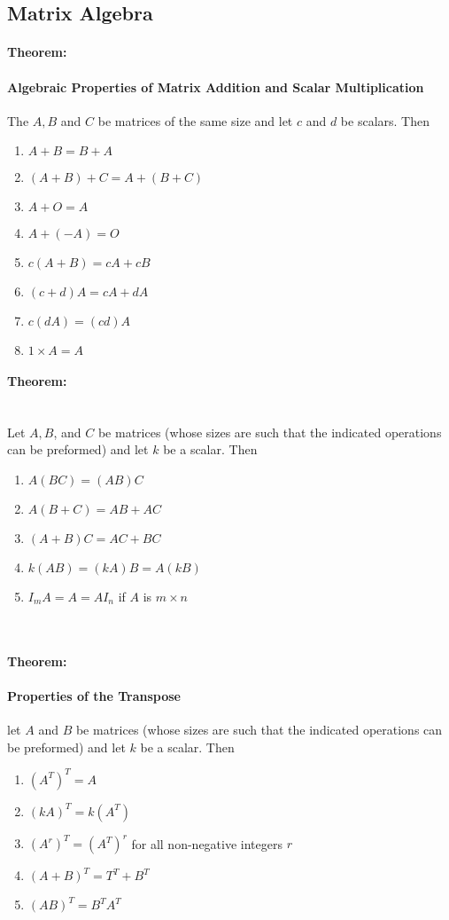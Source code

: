 \documentclass[12pt]{article}
\newenvironment{theorem}{\paragraph{Theorem:\hfill}}{\hfill}
\begin{document}
\subsection{Matrix Algebra}

\begin{theorem}
	\paragraph{Algebraic Properties of Matrix Addition and Scalar Multiplication}
	The $A, B$ and $C$ be matrices of the same size and let $c$ and $d$ be scalars. Then
	\begin{enumerate}
		\item $A + B = B + A$
		\item $(A+B) + C = A + (B + C)$
		\item $A + O = A$
		\item $A + (-A) = O$
		\item $c(A + B) = cA + cB$
		\item $(c + d) A = cA + dA$
		\item $c(dA) = (cd)A$
		\item $1 \times A = A$
	\end{enumerate}
\end{theorem}

\begin{theorem}
	\hfill
	\\
	
	Let $A, B$, and $C$ be matrices (whose sizes are such that the indicated operations can be preformed) and let $k$ be a scalar. Then
	\begin{enumerate}
		\item $A(BC) = (AB)C$
		\item $A(B+C) = AB + AC$
		\item $(A+B)C = AC + BC$
		\item $k(AB) = (kA)B = A(kB)$
		\item $I_mA = A = AI_n$ if $A$ is $m \times n$
	\end{enumerate}
\end{theorem}

\hfill 
\\
\begin{theorem}
		\paragraph{Properties of the Transpose}
		
		let $A$ and $B$ be matrices (whose sizes are such that the indicated operations can be preformed) and let $k$ be a scalar. Then
		
		\begin{enumerate}
			\item $(A^T)^T = A$
			\item $(kA)^T = k(A^T)$
			\item $(A^r)^T = (A^T)^r$ for all non-negative integers $r$
			\item $(A + B)^T = T^T + B^T$
			\item $(AB)^T = B^T A^T$ 
		\end{enumerate} 
\end{theorem}
\end{document}
